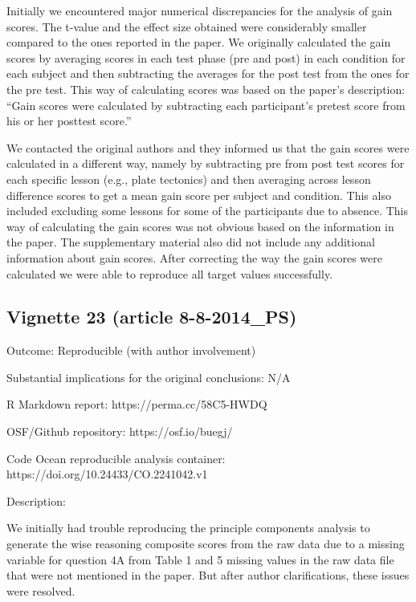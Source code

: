 \documentclass[english,,man,floatsintext]{apa6}
\begin{document}
\begin{appendix}
Initially we encountered major numerical discrepancies for the analysis
of gain scores. The t-value and the effect size obtained were
considerably smaller compared to the ones reported in the paper. We
originally calculated the gain scores by averaging scores in each test
phase (pre and post) in each condition for each subject and then
subtracting the averages for the post test from the ones for the pre
test. This way of calculating scores was based on the paper's
description: ``Gain scores were calculated by subtracting each
participant's pretest score from his or her posttest score.''

We contacted the original authors and they informed us that the gain
scores were calculated in a different way, namely by subtracting pre
from post test scores for each specific lesson (e.g., plate tectonics)
and then averaging across lesson difference scores to get a mean gain
score per subject and condition. This also included excluding some
lessons for some of the participants due to absence. This way of
calculating the gain scores was not obvious based on the information in
the paper. The supplementary material also did not include any
additional information about gain scores. After correcting the way the
gain scores were calculated we were able to reproduce all target values
successfully.

\hypertarget{vignette-23-article-8-8-2014_ps}{%
\subsection{Vignette 23 (article
8-8-2014\_PS)}\label{vignette-23-article-8-8-2014_ps}}

Outcome: Reproducible (with author involvement)

Substantial implications for the original conclusions: N/A

R Markdown report: https://perma.cc/58C5-HWDQ

OSF/Github repository: https://osf.io/buegj/

Code Ocean reproducible analysis container:
https://doi.org/10.24433/CO.2241042.v1

Description:

We initially had trouble reproducing the principle components analysis
to generate the wise reasoning composite scores from the raw data due to
a missing variable for question 4A from Table 1 and 5 missing values in
the raw data file that were not mentioned in the paper. But after author
clarifications, these issues were resolved.


\end{appendix}
\end{document}

